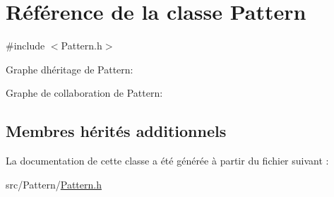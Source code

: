\hypertarget{class_pattern}{}\section{Référence de la classe Pattern}
\label{class_pattern}


{\ttfamily \#include $<$Pattern.\+h$>$}



Graphe d\textquotesingle{}héritage de Pattern\+:


Graphe de collaboration de Pattern\+:
\subsection*{Membres hérités additionnels}


La documentation de cette classe a été générée à partir du fichier suivant \+:\begin{DoxyCompactItemize}
\item 
src/\+Pattern/\hyperlink{_pattern_8h}{Pattern.\+h}\end{DoxyCompactItemize}
